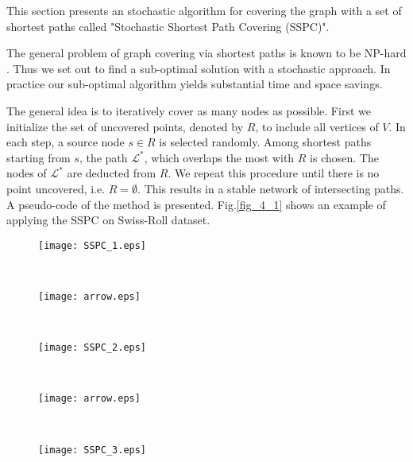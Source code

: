 \documentclass[10pt,journal,cspaper,compsoc]{IEEEtran}
\let\MYoriglatexcaption\caption
\renewcommand{\caption}[2][\relax]{\MYoriglatexcaption[#2]{#2}}
\begin{document}
This section presents an stochastic algorithm for covering the graph with a set of shortest paths called "Stochastic Shortest Path Covering (SSPC)".

The general problem of graph covering via shortest paths is known to be NP-hard \cite{boothe2007graph}. Thus we set out to find a sub-optimal solution with a stochastic approach. In practice our sub-optimal algorithm yields substantial time and space savings.
 
The general idea is to iteratively cover as many nodes as possible. First we initialize the set of uncovered points, denoted by $R$, to include all vertices of $V$. In each step, a source node $s \in R$ is selected randomly. Among shortest paths starting from $s$, the path $\mathcal{L}^*$, which overlaps the most with $R$ is chosen. The nodes of $\mathcal{L}^*$ are deducted from $R$. We repeat this procedure until there is no point uncovered, i.e. $R=\emptyset$. This results in a stable network of intersecting paths. A pseudo-code of the method is presented. Fig.\ref{fig_4_1} shows an example of applying the SSPC on Swiss-Roll dataset.

\begin{figure*}[t]
        \begin{subfigure}[b]{0.29\textwidth}
                \texttt{[image: SSPC\_1.eps]}
                \caption{}
        \end{subfigure}~
        \begin{subfigure}[b]{0.05\textwidth}
		        \texttt{[image: arrow.eps]}	
        \end{subfigure}~
        \begin{subfigure}[b]{0.29\textwidth}
                \texttt{[image: SSPC\_2.eps]}
                \caption{}
        \end{subfigure}~
        \begin{subfigure}[b]{0.05\textwidth}
		        \texttt{[image: arrow.eps]}
        \end{subfigure}~
        \begin{subfigure}[b]{0.29\textwidth}
                \texttt{[image: SSPC\_3.eps]}
                \caption{}
        \end{subfigure}
        \vspace{1mm}
        \caption{{\small SSPC sample run on a Swiss-Roll dataset consisting of $1000$ data points. The number of paths obtained by the method in this example is $P=154$. (a) The high-dimensional data in $\mathcal{R}^3$. (b) Result of the SSPC in $\mathcal{R}^3$. (c) The results shown for the unfolded manifold.}}\label{fig_4_1}
\end{figure*}
\end{document}
